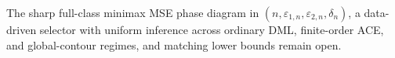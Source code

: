 The sharp full-class minimax MSE phase diagram in \((n,\varepsilon_{1,n},\varepsilon_{2,n},\delta_n)\), a data-driven selector with uniform inference across ordinary DML, finite-order ACE, and global-contour regimes, and matching lower bounds remain open.